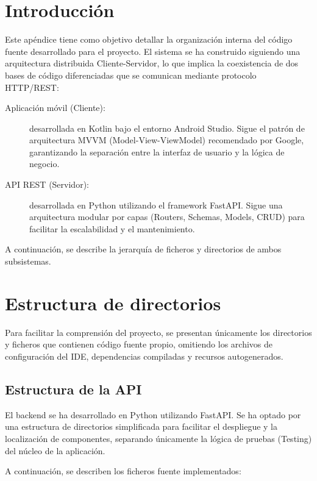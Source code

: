 \label{apendice:D}

\section{Introducción}
Este apéndice tiene como objetivo detallar la organización interna del código fuente desarrollado para el proyecto. El sistema se ha construido siguiendo una arquitectura distribuida Cliente-Servidor, lo que implica la coexistencia de dos bases de código diferenciadas que se comunican mediante protocolo HTTP/REST:

\begin{description}
    \item[Aplicación móvil (Cliente):] desarrollada en Kotlin bajo el entorno Android Studio. Sigue el patrón de arquitectura MVVM (Model-View-ViewModel) recomendado por Google, garantizando la separación entre la interfaz de usuario y la lógica de negocio.
    \item[API REST (Servidor):] desarrollada en Python utilizando el framework FastAPI. Sigue una arquitectura modular por capas (Routers, Schemas, Models, CRUD) para facilitar la escalabilidad y el mantenimiento.
\end{description}

A continuación, se describe la jerarquía de ficheros y directorios de ambos subsistemas.

\section{Estructura de directorios}
Para facilitar la comprensión del proyecto, se presentan únicamente los directorios y ficheros que contienen código fuente propio, omitiendo los archivos de configuración del IDE, dependencias compiladas y recursos autogenerados.

\subsection{Estructura de la API}
El backend se ha desarrollado en Python utilizando FastAPI. Se ha optado por una estructura de directorios simplificada para facilitar el despliegue y la localización de componentes, separando únicamente la lógica de pruebas (Testing) del núcleo de la aplicación.

A continuación, se describen los ficheros fuente implementados:

\newcommand{\codecomment}[1]{\quad\textcolor{gray}{$\rightarrow$ \textit{#1}}}

